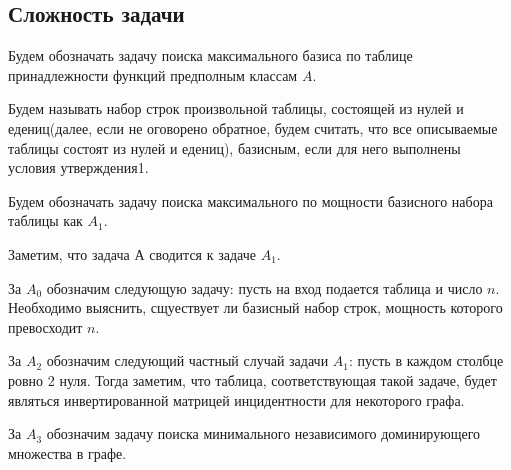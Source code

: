 \documentclass[a4paper,14pt]{extreport}
\begin{document}
\subsection{Сложность задачи}
Будем обозначать задачу поиска максимального базиса по таблице принадлежности функций предполным классам $A$.

Будем называть набор строк произвольной таблицы, состоящей из нулей и едениц(далее, если не оговорено обратное, будем считать, что все описываемые таблицы состоят из нулей и едениц), базисным, если для него выполнены условия утверждения1.

Будем обозначать задачу поиска максимального по мощности базисного набора таблицы как $A_1$.

Заметим, что задача А сводится к задаче $A_1$.

За $A_0$ обозначим следующую задачу: пусть на вход подается таблица и число $n$. Необходимо выяснить, сщуествует ли базисный набор строк, мощность которого превосходит $n$.

За $A_2$ обозначим следующий частный случай задачи $A_1$: пусть в каждом столбце ровно 2 нуля. Тогда заметим, что таблица, соответствующая такой задаче, будет являться инвертированной матрицей инцидентности для некоторого графа.

За $A_3$ обозначим задачу поиска минимального независимого доминирующего множества в графе.
\end{document}
